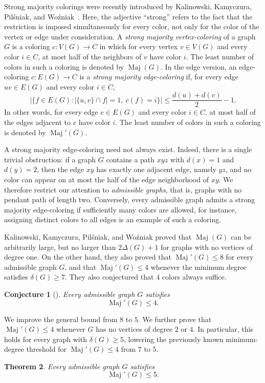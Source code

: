 \documentclass[11pt]{article}
\newtheorem{theorem}{Theorem}
\newtheorem{conjecture}[theorem]{Conjecture}
\theoremstyle{definition}
\DeclareMathOperator{\Maj}{Maj}
\newcommand{\Majp}{\Maj'}
\begin{document}
Strong majority colorings were recently introduced by Kalinowski, Kamyczura, Pilśniak, 
and Woźniak~\cite{KKPW}. Here, the adjective ``strong'' refers to the fact that the restriction is imposed simultaneously for every color, not only for the color of the vertex or edge under consideration. A \emph{strong majority vertex-coloring} of a graph 
$G$ is a coloring $c:V(G)\to C$ in which for every vertex $v\in V(G)$ and every color $i\in C$, at most half of the neighbors of $v$ have color $i$. The least number of colors in such a coloring is denoted by \(\Maj(G)\). 
In the edge version, an edge-coloring $c:E(G)\to C$ is a \emph{strong majority edge-coloring} if, for every edge \(uv\in E(G)\) and every color \(i\in C\),
\[
        \bigl|\{f\in E(G): |\{u,v\}\cap f|=1,~c(f)=i\}\bigr|
        \le
        \frac{d(u)+d(v)}{2}-1.
\]
In other words, for every edge $e\in E(G)$ and every color $i\in C$, at most half of the edges adjacent to $e$ have color $i$. The least number of colors in such a coloring is denoted by \(\Majp(G)\).

A strong majority edge-coloring need not always exist. Indeed, there is a single trivial obstruction: if a graph $G$ contains a path \(xyz\) with \(d(x)=1\) and \(d(y)=2\), then the edge \(xy\) has exactly one adjacent edge, namely \(yz\), and no color can appear on at most the half of the edge neighborhood of \(xy\). We therefore restrict our attention to \emph{admissible graphs}, that is, graphs with no pendant path of length two.  
Conversely, every admissible graph admits a strong majority edge-coloring if sufficiently many colors are allowed, for instance, assigning distinct colors to all edges is an example of such a coloring.

Kalinowski, Kamyczura, Pilśniak, and Woźniak \cite{KKPW} proved that $\Maj(G)$ can be arbitrarily large, but no larger than $2\Delta(G)+1$ for graphs with no vertices of degree one.
On the other hand, they also proved that \(\Majp(G)\le 8\) for
every admissible graph \(G\), and that \(\Majp(G)\le 4\) whenever the minimum
degree satisfies \(\delta(G)\ge 7\). They also conjectured that \(4\) colors always
suffice.

\begin{conjecture}[\cite{KKPW}]
Every admissible graph \(G\) satisfies
\[
        \Majp(G)\le 4.
\]
\end{conjecture}

We improve the general bound from \(8\) to \(5\). We further prove that $\Majp(G)\le 4$
whenever \(G\) has no vertices of degree \(2\) or \(4\). In particular, this holds for every graph with \(\delta(G)\ge 5\), lowering the previously known minimum-degree threshold for \(\Majp(G)\le 4\) from \(7\) to \(5\).
\begin{theorem}\label{thm:five}
Every admissible graph \(G\) satisfies
\[
        \Majp(G)\le 5.
\]
\end{theorem}
\end{document}

